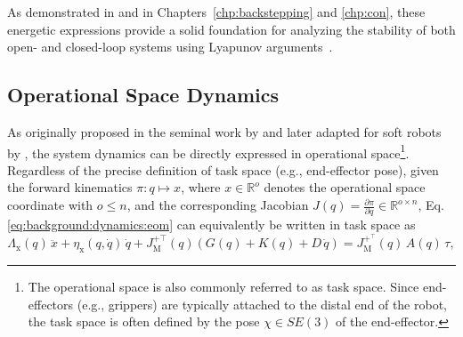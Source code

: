 As demonstrated in \citet{della2020model, della2023model} and in Chapters~\ref{chp:backstepping} and \ref{chp:con}, these energetic expressions provide a solid foundation for analyzing the stability of both open- and closed-loop systems using Lyapunov arguments~\citep{khalil2002nonlinear}.

\subsection{Operational Space Dynamics}\label{sub:background:dynamics:task_space}
As originally proposed in the seminal work by \citet{khatib1987unified} and later adapted for soft robots by \citet{della2020model}, the system dynamics can be directly expressed in operational space\footnote{The operational space is also commonly referred to as task space. Since end-effectors (e.g., grippers) are typically attached to the distal end of the robot, the task space is often defined by the pose $\chi \in SE(3)$ of the end-effector.}. Regardless of the precise definition of task space (e.g., end-effector pose), given the forward kinematics $\pi: q \mapsto x$, where $x \in \mathbb{R}^o$ denotes the operational space coordinate with $o \leq n$, and the corresponding Jacobian $J(q) = \frac{\partial \pi}{\partial q} \in \mathbb{R}^{o \times n}$, Eq.\ref{eq:background:dynamics:eom} can equivalently be written in task space as
\begin{equation}\label{eq:background:dynamics:eom_task_space}
    \Lambda_\mathrm{x}(q) \, \ddot{x} + \eta_\mathrm{x}(q, \dot{q}) \, \dot{q} + J_\mathrm{M}^{+\top}(q) \left ( G(q) + K(q) + D \, \dot{q} \right ) = J_\mathrm{M}^{+^\top}(q) \, A(q) \, \tau,
\end{equation}
